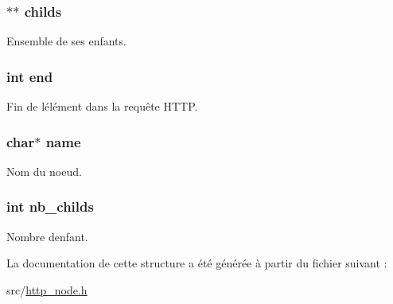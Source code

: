\subsubsection[{\texorpdfstring{childs}{childs}}]{$\ast$$\ast$ childs}\hypertarget{struct_h_t_t_p___node_ab6c4f7b695ae0ff1af4af91419340f98}{}\label{struct_h_t_t_p___node_ab6c4f7b695ae0ff1af4af91419340f98}
Ensemble de ses enfants. 
\subsubsection[{\texorpdfstring{end}{end}}]{\setlength{\rightskip}{0pt plus 5cm}int end}\hypertarget{struct_h_t_t_p___node_abce9f5dc9c83f2639b72024fdee5d388}{}\label{struct_h_t_t_p___node_abce9f5dc9c83f2639b72024fdee5d388}
Fin de l\textquotesingle{}élément dans la requête H\+T\+TP. 
\subsubsection[{\texorpdfstring{name}{name}}]{\setlength{\rightskip}{0pt plus 5cm}char$\ast$ name}\hypertarget{struct_h_t_t_p___node_a5ac083a645d964373f022d03df4849c8}{}\label{struct_h_t_t_p___node_a5ac083a645d964373f022d03df4849c8}
Nom du noeud. 
\subsubsection[{\texorpdfstring{nb\+\_\+childs}{nb_childs}}]{\setlength{\rightskip}{0pt plus 5cm}int nb\+\_\+childs}\hypertarget{struct_h_t_t_p___node_a7ef173e87af6384077b245308271482d}{}\label{struct_h_t_t_p___node_a7ef173e87af6384077b245308271482d}
Nombre d\textquotesingle{}enfant. 

La documentation de cette structure a été générée à partir du fichier suivant \+:\begin{DoxyCompactItemize}
\item 
src/\hyperlink{http__node_8h}{http\+\_\+node.\+h}\end{DoxyCompactItemize}
